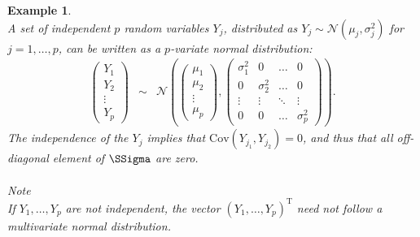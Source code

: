 \documentclass[a4paper]{article}
\theoremstyle{myexamplestyle}
\newtheorem{example}{Example}
\begin{document}
\begin{example} \textit{  }
\\
A set of independent $p$ random  variables $Y_j$, distributed as $Y_j \sim \mathcal{N}( \mu_j, \sigma_j^2)$ for $j=1, \ldots, p$, can be written as a $p$-variate normal distribution:
\begin{eqnarray*}
\left(
\begin{array}{l}
Y_{1}
\\
Y_{2}
\\
\vdots
\\
Y_{p}
\end{array}
\right)
& \sim &
\mathcal{N} \left(
\left(
\begin{array}{l}
\mu_{1}
\\
\mu_{2}
\\
\vdots
\\
\mu_{p}
\end{array}
\right),
\left(
\begin{array}{cccc}
\sigma_{1}^{2} & 0 & \ldots & 0
\\
0 & \sigma_{2}^{2} & \ldots & 0
\\
\vdots & \vdots & \ddots & \vdots
\\
0 & 0 & \ldots & \sigma_{p}^{2}
\end{array}
\right)
\right).
\end{eqnarray*}
The independence of the $Y_j$ implies that $\mbox{Cov}(Y_{j_1}, Y_{j_2}) = 0$, and thus that all off-diagonal element of $\SSigma$ are zero.
\\
\\
\textit{Note}
\\
If $Y_1, \ldots, Y_p$ are not independent, the vector $(Y_1, \ldots, Y_p)^\mathrm{T}$ need not follow a multivariate normal distribution.
\end{example}
\end{document}

